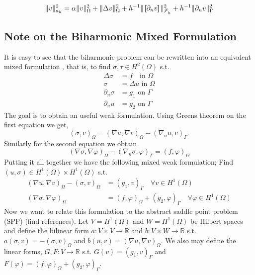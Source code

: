\begin{equation*}
\|v\|_{a_{h}} ^{2}  = \alpha  \|v\|_{  \Omega  }^2 + \|\Delta v\|_{ \Omega  }^2
+ h^{-1} \| \left[\!\!\left[  \partial_n v  \right]\!\!\right] \|_{ \mathcal{F}_{h}^{}    }^{2} + h^{-1} \|  \partial_n v  \|_{ \Gamma    }^{2}
\end{equation*}


\subsection{Note on the Biharmonic Mixed Formulation}%
\label{subsec:biharmonic_mixed_formulation}

It is easy to see that the biharmonic problem can be rewritten into an equivalent mixed formulation , that is, to find $\sigma, \tau  \in H^2( \Omega ) $ s.t. \[
    \begin{split}
\Delta \sigma  & = f \quad  \text{in } \Omega \\
\sigma   & = \Delta u  \text{ in } \Omega \\
\partial _{n} \sigma  & = g_{1} \text{ on } \Gamma  \\
\partial _{n} u   & = g_{2} \text{ on } \Gamma
    \end{split}
\]
The goal is to obtain an useful weak formulation. Using Greens theorem on the first equation we get,
\[
( \sigma, v)_{\Omega } = ( \nabla  u , \nabla v  )_{\Omega } - ( \nabla _{n} u , v) _{\Gamma }.
\]
Similarly for the second equation we obtain
\[
( \nabla \sigma , \nabla \varphi  )_{\Omega} - ( \nabla _{n} \sigma ,  \varphi )_{\Gamma } = ( f,\varphi ) _{\Omega}
\]
Putting it all together we have the following mixed weak formulation; Find $( u, \sigma ) \in H^{1}( \Omega ) \times H^{1}( \Omega )  $ s.t. \[
    \begin{split}
     ( \nabla  u , \nabla v  )_{\Omega } -( \sigma, v)_{\Omega }  & =   ( g_{1} , v) _{\Gamma } \quad  \forall v \in H^{1}( \Omega ) \\
( \nabla \sigma , \nabla \varphi  )_{\Omega}  & = ( f,\varphi ) _{\Omega} + ( g_{2} ,  \varphi )_{\Gamma } \quad  \forall \varphi \in H^{1}( \Omega )
    \end{split}
\]
Now we want to relate this formulation to the abstract saddle point problem (SPP) (find references).
Let $V = H^{1}( \Omega ) $  and $W=H^{1}( \Omega ) $ be  Hilbert spaces and define the bilinear form $a: V\times V \to \mathbb{R}  $ and $b: V \times W \to \mathbb{R} $ s.t. $a( \sigma,v ) = - ( \sigma , v) _{\Omega }  $ and $b( u,v) = ( \nabla u,
\nabla v)_{\Omega  }  $. We also may define the linear forms, $G,F: V \to \mathbb{R} $ s.t. $ G( v)  = ( g_{1}, v) _{\Gamma } $ and $F( \varphi ) = ( f, \varphi )_{\Omega } + ( g_{2}, \varphi )_{\Gamma } $.

